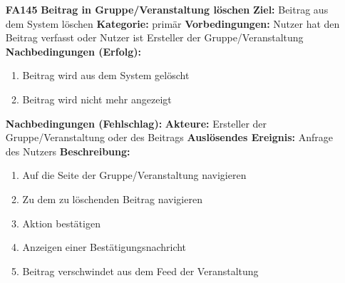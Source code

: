 \documentclass[parskip=full]{scrartcl}
\begin{document}
\begin{itemize}[nosep]
			\item[\textbf{FA145}]\textbf{Beitrag in Gruppe/Veranstaltung löschen}
			\newline \textbf{Ziel:} Beitrag aus dem System löschen
			\newline \textbf{Kategorie:} primär
			\newline \textbf{Vorbedingungen:} Nutzer hat den Beitrag verfasst oder Nutzer ist Ersteller der Gruppe/Veranstaltung
			\newline \textbf{Nachbedingungen (Erfolg):}
			\begin{enumerate}[nosep]
				\item Beitrag wird aus dem System gelöscht
				\item Beitrag wird nicht mehr angezeigt
			\end{enumerate}
			\textbf{Nachbedingungen (Fehlschlag):}
			\newline \textbf{Akteure:} Ersteller der Gruppe/Veranstaltung oder des Beitrags
			\newline \textbf{Auslösendes Ereignis:} Anfrage des Nutzers
			\newline \textbf{Beschreibung:}
			\begin{enumerate}[nosep]
				\item Auf die Seite der Gruppe/Veranstaltung navigieren
				\item Zu dem zu löschenden Beitrag navigieren
				\item Aktion bestätigen
				\item Anzeigen einer Bestätigungsnachricht
				\item Beitrag verschwindet aus dem \gls{Feed} der Veranstaltung\\
			\end{enumerate}
			

\end{itemize}
\end{document}
